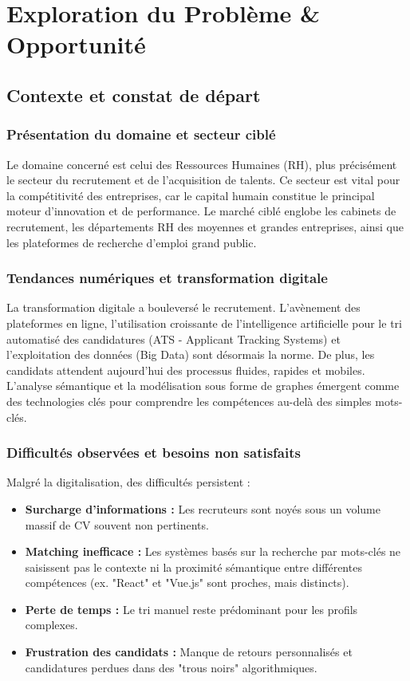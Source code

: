 \documentclass[12pt,a4paper]{report}
\begin{document}
\chapter{Exploration du Problème \& Opportunité}

\section{Contexte et constat de départ}

\subsection{Présentation du domaine et secteur ciblé}
Le domaine concerné est celui des Ressources Humaines (RH), plus précisément le secteur du recrutement et de l'acquisition de talents. Ce secteur est vital pour la compétitivité des entreprises, car le capital humain constitue le principal moteur d'innovation et de performance. Le marché ciblé englobe les cabinets de recrutement, les départements RH des moyennes et grandes entreprises, ainsi que les plateformes de recherche d'emploi grand public.

\subsection{Tendances numériques et transformation digitale}
La transformation digitale a bouleversé le recrutement. L'avènement des plateformes en ligne, l'utilisation croissante de l'intelligence artificielle pour le tri automatisé des candidatures (ATS - Applicant Tracking Systems) et l'exploitation des données (Big Data) sont désormais la norme. De plus, les candidats attendent aujourd'hui des processus fluides, rapides et mobiles. L'analyse sémantique et la modélisation sous forme de graphes émergent comme des technologies clés pour comprendre les compétences au-delà des simples mots-clés.

\subsection{Difficultés observées et besoins non satisfaits}
Malgré la digitalisation, des difficultés persistent :
\begin{itemize}
    \item \textbf{Surcharge d'informations :} Les recruteurs sont noyés sous un volume massif de CV souvent non pertinents.
    \item \textbf{Matching inefficace :} Les systèmes basés sur la recherche par mots-clés ne saisissent pas le contexte ni la proximité sémantique entre différentes compétences (ex. "React" et "Vue.js" sont proches, mais distincts).
    \item \textbf{Perte de temps :} Le tri manuel reste prédominant pour les profils complexes.
    \item \textbf{Frustration des candidats :} Manque de retours personnalisés et candidatures perdues dans des "trous noirs" algorithmiques.
\end{itemize}
\end{document}
